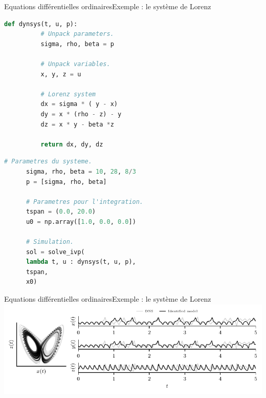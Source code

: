 \documentclass[usenames,dvipsnames,svgnames,10pt,aspectratio=169]{beamer}
\begin{document}
\begin{frame}[t, c, fragile]{Equations différentielles ordinaires}{Exemple : le système de Lorenz}
  \begin{minipage}{.48\textwidth}
    \begin{lstlisting}[language=Python]
      def dynsys(t, u, p):
          # Unpack parameters.
          sigma, rho, beta = p

          # Unpack variables.
          x, y, z = u

          # Lorenz system
          dx = sigma * ( y - x)
          dy = x * (rho - z) - y
          dz = x * y - beta *z

          return dx, dy, dz
    \end{lstlisting}
  \end{minipage}%
  \hfill
  \begin{minipage}{.48\textwidth}
    \begin{lstlisting}[language=Python]
      # Parametres du systeme.
      sigma, rho, beta = 10, 28, 8/3
      p = [sigma, rho, beta]

      # Parametres pour l'integration.
      tspan = (0.0, 20.0)
      u0 = np.array([1.0, 0.0, 0.0])

      # Simulation.
      sol = solve_ivp(
      lambda t, u : dynsys(t, u, p),
      tspan,
      x0)

    \end{lstlisting}
  \end{minipage}
\end{frame}

\begin{frame}[t, c]{Equations différentielles ordinaires}{Exemple : le système de Lorenz}
  \centering
  \includegraphics[width=\textwidth]{attractor_comparison}
\end{frame}
\end{document}
